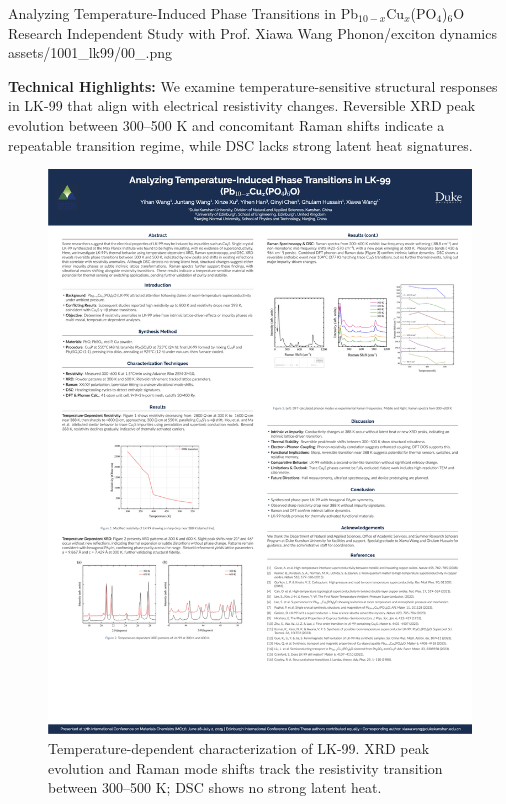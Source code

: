 \ProjectEntry
{Analyzing Temperature-Induced Phase Transitions in Pb$_{10-x}$Cu$_x$(PO$_4$)$_6$O}
{Research Independent Study with Prof. Xiawa Wang}
{Phonon/exciton dynamics}
{
}
{assets/1001_lk99/00_.png}
{ \quad {}}
{  }

\textbf{Technical Highlights:}
We examine temperature-sensitive structural responses in LK-99 that align with electrical resistivity changes. Reversible XRD peak evolution between 300--500 K and concomitant Raman shifts indicate a repeatable transition regime, while DSC lacks strong latent heat signatures.

\begin{figure}[ht]
  \centering
  \includegraphics[width=0.8\linewidth]{assets/1001_lk99/00_.png}
  \caption{Temperature-dependent characterization of LK-99. XRD peak evolution and Raman mode shifts track the resistivity transition between 300--500 K; DSC shows no strong latent heat.}
  \label{fig:lk99_temp}
\end{figure}

